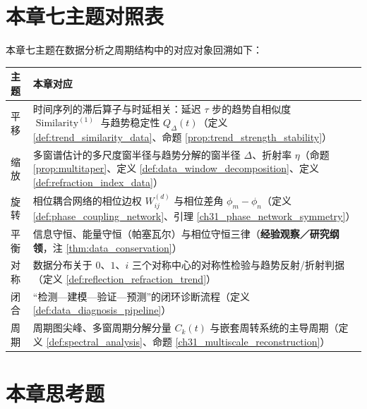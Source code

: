\section*{本章七主题对照表}
本章七主题在数据分析之周期结构中的对应对象回溯如下：
\begin{center}
\begin{tabular}{>{\centering\arraybackslash}p{2.2cm}>{\centering\arraybackslash}p{9.5cm}}
\toprule
主题 & 本章对应 \\
\midrule
平移 & 时间序列的滞后算子与时延相关：延迟 $\tau$ 步的趋势自相似度 $\operatorname{Similarity}^{(1)}$ 与趋势稳定性 $Q_\Delta(t)$（定义 \ref{def:trend_similarity_data}、命题 \ref{prop:trend_strength_stability}） \\
缩放 & 多窗谱估计的多尺度窗半径与趋势分解的窗半径 $\Delta$、折射率 $\eta$（命题 \ref{prop:multitaper}、定义 \ref{def:data_window_decomposition}、定义 \ref{def:refraction_index_data}） \\
旋转 & 相位耦合网络的相位边权 $W_{ij}^{(d)}$ 与相位差角 $\phi_m-\phi_n$（定义 \ref{def:phase_coupling_network}、引理 \ref{ch31_phase_network_symmetry}） \\
平衡 & 信息守恒、能量守恒（帕塞瓦尔）与相位守恒三律（\textbf{经验观察／研究纲领}，注 \ref{thm:data_conservation}） \\
对称 & 数据分布关于 $0$、$1$、$i$ 三个对称中心的对称性检验与趋势反射/折射判据（定义 \ref{def:reflection_refraction_trend}） \\
闭合 & “检测—建模—验证—预测”的闭环诊断流程（定义 \ref{def:data_diagnosis_pipeline}） \\
周期 & 周期图尖峰、多窗周期分解分量 $C_k(t)$ 与嵌套周转系统的主导周期（定义 \ref{def:spectral_analysis}、命题 \ref{ch31_multiscale_reconstruction}） \\
\bottomrule
\end{tabular}
\end{center}

\section*{本章思考题}

